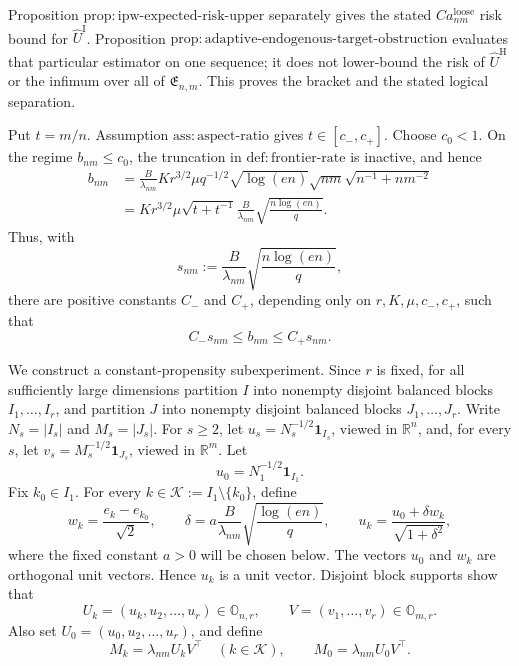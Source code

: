 Proposition \(\mathrm{prop:ipw\mbox{-}expected\mbox{-}risk\mbox{-}upper}\) separately gives the stated \(Ca^{\mathrm{loose}}_{nm}\) risk bound for \(\widehat U^{\mathrm I}\).  Proposition \(\mathrm{prop:adaptive\mbox{-}endogenous\mbox{-}target\mbox{-}obstruction}\) evaluates that particular estimator on one sequence; it does not lower-bound the risk of \(\widehat U^{\mathrm H}\) or the infimum over all of \(\mathfrak E_{n,m}\).  This proves the bracket and the stated logical separation.

Put \(t=m/n\).  Assumption \(\mathrm{ass:aspect\mbox{-}ratio}\) gives \(t\in[c_-,c_+]\).  Choose \(c_0<1\).  On the regime \(b_{nm}\le c_0\), the truncation in \(\mathrm{def:frontier\mbox{-}rate}\) is inactive, and hence
\[
 \begin{aligned}
 b_{nm}
 &=\frac{B}{\lambda_{nm}}K r^{3/2}\mu q^{-1/2}
   \sqrt{\log(en)}\sqrt{nm}\sqrt{n^{-1}+nm^{-2}}\\
 &=K r^{3/2}\mu\sqrt{t+t^{-1}}
   \frac{B}{\lambda_{nm}}\sqrt{\frac{n\log(en)}q}.
 \end{aligned}
\]
Thus, with
\[
 s_{nm}:=\frac{B}{\lambda_{nm}}\sqrt{\frac{n\log(en)}q},
\]
there are positive constants \(C_-\) and \(C_+\), depending only on \(r,K,\mu,c_-,c_+\), such that
\[
 C_-s_{nm}\le b_{nm}\le C_+s_{nm}.
 \tag{1}
\]

We construct a constant-propensity subexperiment.  Since \(r\) is fixed, for all sufficiently large dimensions partition \(I\) into nonempty disjoint balanced blocks \(I_1,\ldots,I_r\), and partition \(J\) into nonempty disjoint balanced blocks \(J_1,\ldots,J_r\).  Write \(N_s=|I_s|\) and \(M_s=|J_s|\).  For \(s\ge2\), let \(u_s=N_s^{-1/2}\mathbf1_{I_s}\), viewed in \(\mathbb R^n\), and, for every \(s\), let \(v_s=M_s^{-1/2}\mathbf1_{J_s}\), viewed in \(\mathbb R^m\).  Let
\[
 u_0=N_1^{-1/2}\mathbf1_{I_1}.
\]
Fix \(k_0\in I_1\).  For every \(k\in\mathcal K:=I_1\setminus\{k_0\}\), define
\[
 w_k=\frac{e_k-e_{k_0}}{\sqrt2},\qquad
 \delta=a\frac{B}{\lambda_{nm}}\sqrt{\frac{\log(en)}q},\qquad
 u_k=\frac{u_0+\delta w_k}{\sqrt{1+\delta^2}},
 \tag{2}
\]
where the fixed constant \(a>0\) will be chosen below.  The vectors \(u_0\) and \(w_k\) are orthogonal unit vectors.  Hence \(u_k\) is a unit vector.  Disjoint block supports show that
\[
 U_k=(u_k,u_2,\ldots,u_r)\in\mathbb O_{n,r},
 \qquad V=(v_1,\ldots,v_r)\in\mathbb O_{m,r}.
\]
Also set \(U_0=(u_0,u_2,\ldots,u_r)\), and define
\[
 M_k=\lambda_{nm}U_kV^\top\quad(k\in\mathcal K),
 \qquad M_0=\lambda_{nm}U_0V^\top.
 \tag{3}
\]

